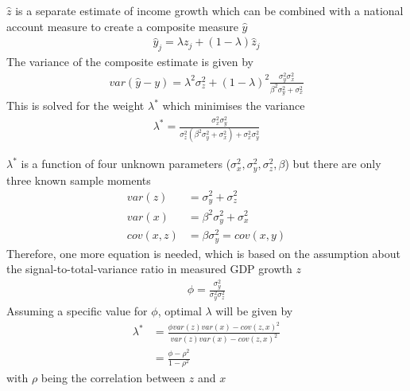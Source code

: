 \documentclass{beamer}
\begin{document}
\begin{frame}
  $\hat{z}$ is a separate estimate of income growth which can be combined with a national account measure to create a composite measure $\hat{y}$
  \begin{align}
    \hat{y}_j=\lambda z_j + (1-\lambda)\hat{z}_j
  \end{align}
  The variance of the composite estimate is given by  
  \begin{align}
    var(\hat{y}-y)=\lambda^2\sigma^2_z + (1-\lambda)^2 \frac{\sigma^2_y \sigma^2_x}{\beta^2 \sigma^2_y + \sigma^2_x}
  \end{align}
  This is solved for the weight $\lambda^*$ which minimises the variance
  \begin{align}
    \lambda^* = \frac{\sigma^2_x \sigma^2_y}{\sigma^2_z(\beta^2 \sigma^2_y + \sigma^2_x) + \sigma^2_x \sigma^2_y}
  \end{align} 
\end{frame}

\begin{frame}
  $\lambda^*$ is a function of four unknown parameters ($\sigma^2_x,\sigma^2_y,\sigma^2_z,\beta$) but there are only three known sample moments
  \begin{align}
    var(z) &= \sigma^2_y + \sigma^2_z\\
    var(x) &= \beta^2 \sigma^2_y + \sigma^2_x\\
    cov(x,z) &= \beta \sigma^2_y = cov(x,y)
  \end{align}
  Therefore, one more equation is needed, which is based on the assumption about the signal-to-total-variance ratio in measured GDP growth $z$
  \begin{align}
    \phi= \frac{\sigma^2_y}{\sigma^2_y \sigma^2_z}
  \end{align}
  \medskip
  Assuming a specific value for $\phi$, optimal $\lambda$ will be given by
  \begin{align}
    \lambda^* &= \frac{\phi var(z)var(x) -cov(z,x)^2}{var(z)var(x)-cov(z,x)^2} \\ \nonumber
     &= \frac{\phi-\rho^2}{1-\rho^2}
  \end{align}
  with $\rho$ being the correlation between $z$ and $x$
\end{frame}
\end{document}
